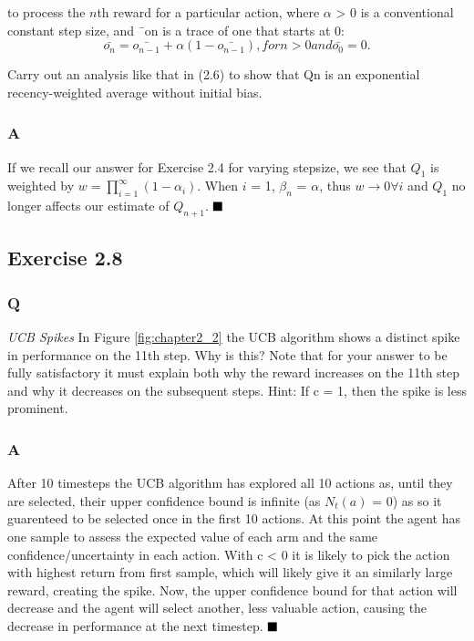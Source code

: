 to process the \(n\)th reward for a particular action, where \(\alpha\) > 0 is a conventional constant step size, and ¯on is a trace of one that starts at 0:
\begin{equation}
	\bar{o_n} = \bar{o_{n-1}} + \alpha(1 - \bar{o_{n-1}}), for n > 0 and \bar{o_0} = 0.
\end{equation}

Carry out an analysis like that in (2.6) to show that Qn is an exponential recency-weighted
average without initial bias.

\subsubsection*{A}
If we recall our answer for Exercise 2.4 for varying stepsize, we see that \(Q_1\) is weighted by \(w = \prod_{i=1}^{\infty} (1 - \alpha_i)\). When \(i\) = 1, \(\beta_n\) = \(\alpha\), thus \(w \rightarrow 0 \forall i\) and \(Q_1\) no longer affects our estimate of \(Q_{n+1}\).
$
\hfill \blacksquare
$

\subsection{Exercise 2.8}
\subsubsection*{Q}
\textit{UCB Spikes} In Figure \ref{fig:chapter2_2} the UCB algorithm shows a distinct spike in performance on the 11th step. Why is this? Note that for your answer to be fully satisfactory it must explain both why the reward increases on the 11th step and why it decreases on the subsequent steps. Hint: If c = 1, then the spike is less prominent.

\subsubsection*{A}
After 10 timesteps the UCB algorithm has explored all 10 actions as, until they are selected, their upper confidence bound is infinite (as \(N_t(a)\) = 0) as so it guarenteed to be selected once in the first 10 actions. At this point the agent has one sample to assess the expected value of each arm and the same confidence/uncertainty in each action. With c < 0 it is likely to pick the action with highest return from first sample, which will likely give it an similarly large reward, creating the spike. Now, the upper confidence bound for that action will decrease and the agent will select another, less valuable action, causing the decrease in performance at the next timestep.
$
\hfill \blacksquare
$

